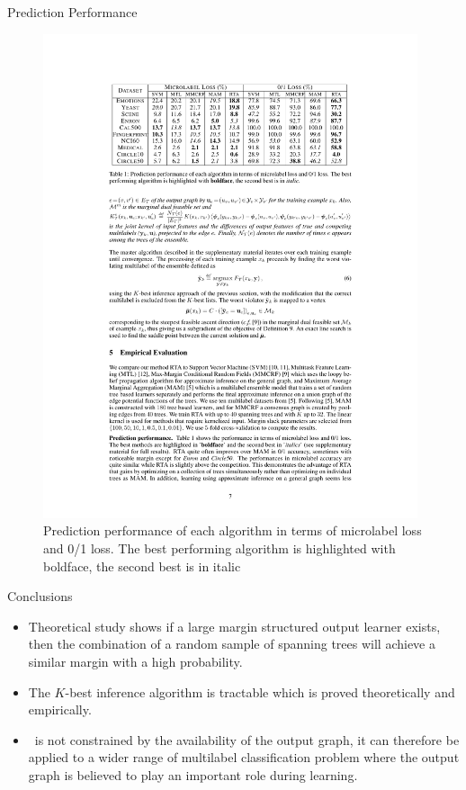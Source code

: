 \documentclass[first=dgreen,second=purple,logo=yellowexc]{aaltoslides}
\begin{document}
%
\begin{frame}{Prediction Performance}
	\begin{figure}
		\begin{center}
			\includegraphics[width=11cm]{./result_table.pdf}
			\caption{Prediction performance of each algorithm in terms of microlabel loss and 0/1 loss. The best performing algorithm is highlighted with boldface, the second best is in italic}
		\end{center}
	\end{figure}
\end{frame}



%
\begin{frame}{Conclusions}
	\begin{itemize}
		\item Theoretical study shows if a large margin structured output learner exists,  then the combination of a random sample of spanning trees will achieve a similar margin with a high probability.
		\item The $K$-best inference algorithm is tractable which is proved theoretically and empirically.
		\item \rta\ is not constrained by the availability of the output graph, it can therefore be applied to a wider range of multilabel classification problem where the output graph is believed to play an important role during learning.
	\end{itemize}
\end{frame}

\end{document}
